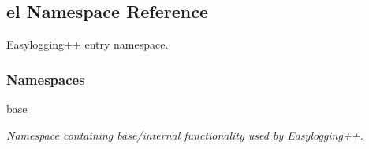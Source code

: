\hypertarget{a00183}{}\subsection{el Namespace Reference}
\label{a00183}


Easylogging++ entry namespace.  


\subsubsection*{Namespaces}
\begin{DoxyCompactItemize}
\item 
 \hyperlink{a00184}{base}
\begin{DoxyCompactList}\small\item\em Namespace containing base/internal functionality used by Easylogging++. \end{DoxyCompactList}\end{DoxyCompactItemize}
